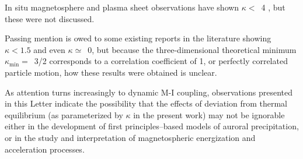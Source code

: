   In situ magnetosphere and plasma sheet observations
  \citet{Christon1989,Christon1991,Kletzing2003} have shown $\kappa <$~4 , but
  these were not discussed.

  Passing mention is owed to some existing reports in the literature showing
  $\kappa < 1.5$ and even $\kappa \simeq$~0, but because the three-dimensional
  theoretical minimum $\kappa_{\mathrm{min}} =$~3/2 corresponds to a correlation
  coefficient of 1, or perfectly correlated particle motion, how these results
  were obtained is unclear.

  As attention turns increasingly to dynamic M-I coupling, observations
  presented in this Letter indicate the possibility that the effects of
  deviation from thermal equilibrium (as parameterized by $\kappa$ in the
  present work) may not be ignorable either in the development of first
  principles--based models of auroral precipitation, or in the study and
  interpretation of magnetospheric energization and acceleration processes.


  



